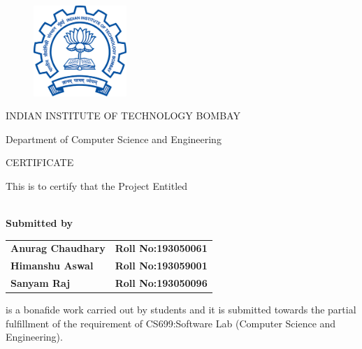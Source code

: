 \documentclass[oneside,a4paper,12pt]{article}
\begin{document}
\newpage



\begin{figure}[ht]
\centering
\includegraphics[width=100pt]{IIT_Bombay_color_logo.png}
\end{figure}


{\bfseries \fontsize{14}{12} \selectfont \centerline{INDIAN INSTITUTE OF TECHNOLOGY BOMBAY}
\vspace{10pt}
\centerline{Department of Computer Science and Engineering}
\vspace*{2\baselineskip}} 


{\bfseries \fontsize{16}{12} \selectfont \centerline{CERTIFICATE} 
\vspace*{2\baselineskip}} 

\centerline{This is to certify that the Project Entitled}
\vspace*{.5\baselineskip} 

\begin{center}
{\bfseries \fontsize{14}{12} \selectfont {INSTI-BLOG}
\vspace*{1\baselineskip}
\\Submitted by
\vspace*{0.5\baselineskip}}

\begin{tabular}{l l}
\bfseries{Anurag Chaudhary}     &  \hspace{10mm}\bfseries{Roll No:193050061}\\
\bfseries{Himanshu Aswal}     &  \hspace{10mm}\bfseries{Roll No:193059001}\\
\bfseries{Sanyam Raj}     &  \hspace{10mm}\bfseries{Roll No:193050096}\\



\end{tabular}
\end{center}




is a bonafide work carried out by students and it
is submitted towards the partial fulfillment of the requirement of CS699:Software Lab (Computer Science and Engineering).\\
\end{document}
